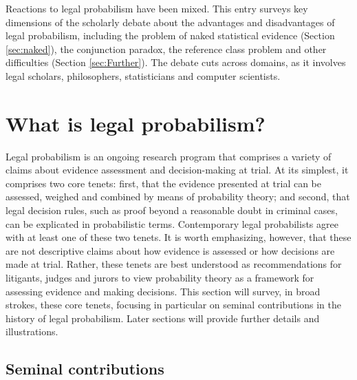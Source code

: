 \documentclass{article}
\begin{document}
 Reactions to legal probabilism have been mixed. This entry surveys key dimensions of the scholarly debate about the advantages and disadvantages of legal probabilism, including the problem of naked statistical evidence (Section \ref{sec:naked}),  the conjunction paradox, the reference class problem and other difficulties (Section \ref{sec:Further}). The debate cuts across domains, as it involves legal scholars, philosophers, statisticians and computer scientists.  





\pagebreak 

\tableofcontents


\pagebreak 


\section{What is legal probabilism?}
\label{sec:history}

Legal probabilism is an ongoing research program that comprises a variety of claims about evidence assessment and decision-making at trial. At its simplest, it comprises two core tenets: first, that the evidence presented at trial can be assessed, weighed and combined by means of probability theory; and second, that legal decision rules,  such as proof beyond a reasonable doubt in criminal cases, can be explicated in probabilistic terms.  Contemporary legal probabilists agree with at least one of these two tenets. 
It is worth emphasizing, however, that these are not descriptive claims about how evidence is assessed or how decisions are made at trial. Rather, these tenets are best understood as recommendations for litigants, judges and 
jurors to view probability theory as a framework for assessing evidence and making decisions. This section will survey, in broad strokes, these core tenets, focusing in particular on seminal contributions in the history of legal probabilism. Later sections will  provide further details and illustrations. 

\subsection{Seminal contributions}
\end{document}
